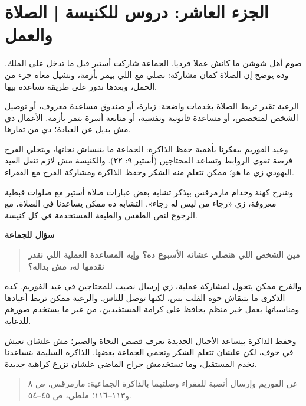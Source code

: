 \documentclass[12pt,a4paper]{article}
\begin{document}
\section*{الجزء العاشر: دروس للكنيسة | الصلاة والعمل}
صوم أهل شوشن ما كانش عملا فرديا. الجماعة شاركت أستير قبل ما تدخل على الملك. وده يوضح إن الصلاة كمان مشاركة: نصلي مع اللي بيمر بأزمة، ونشيل معاه جزء من الحمل، وبعدها ندور على طريقة نساعده بيها.\par\medskip
الرعية تقدر تربط الصلاة بخدمات واضحة: زيارة، أو صندوق مساعدة معروف، أو توصيل الشخص لمتخصص، أو مساعدة قانونية ونفسية، أو متابعة أسرة بتمر بأزمة. الأعمال دي مش بديل عن العبادة؛ دي من ثمارها.\par\medskip
وعيد الفوريم بيفكرنا بأهمية حفظ الذاكرة: الجماعة ما بتنساش نجاتها، وبتخلي الفرح فرصة تقوي الروابط وتساعد المحتاجين (أستير ٩: ٢٢). والكنيسة مش لازم تنقل العيد اليهودي زي ما هو؛ ممكن تتعلم منه الشكر وحفظ الذاكرة ومشاركة الفرح مع الفقراء.\par\medskip
وشرح كهنة وخدام مارمرقس بيذكر تشابه بعض عبارات صلاة أستير مع صلوات قبطية معروفة، زي «رجاء من ليس له رجاء». التشابه ده ممكن يساعدنا في الصلاة، مع الرجوع لنص الطقس والطبعة المستخدمة في كل كنيسة.\par\medskip
\vspace{0.2em}\noindent\textcolor{ochre}{\textbf{سؤال للجماعة}}\par\smallskip
\begin{quote}\colorbox{soft}{\parbox{0.94\linewidth}{\textbf{مين الشخص اللي هنصلي عشانه الأسبوع ده؟ وإيه المساعدة العملية اللي نقدر نقدمها له، مش بداله؟}}}\end{quote}
والفرح ممكن يتحول لمشاركة عملية، زي إرسال نصيب للمحتاجين في عيد الفوريم. كده الذكرى ما بتبقاش جوه القلب بس، لكنها توصل للناس. والرعية ممكن تربط أعيادها ومناسباتها بعمل خير منظم يحافظ على كرامة المستفيدين، من غير ما يستخدم صورهم للدعاية.\par\medskip
وحفظ الذاكرة بيساعد الأجيال الجديدة تعرف قصص النجاة والصبر؛ مش علشان تعيش في خوف، لكن علشان تتعلم الشكر وتحمي الجماعة بعضها. الذاكرة السليمة بتساعدنا نخدم المستقبل، وما تستخدمش جراح الماضي علشان تزرع كراهية جديدة.\par\medskip
\begin{quote}\small\color{muted}عن الفوريم وإرسال أنصبة للفقراء وصلتهما بالذاكرة الجماعية: مارمرقس، ص ٨ و١١٣–١١٦؛ ملطي، ص ٤٥–٥٤.\end{quote}
\clearpage
\clearpage
\end{document}
